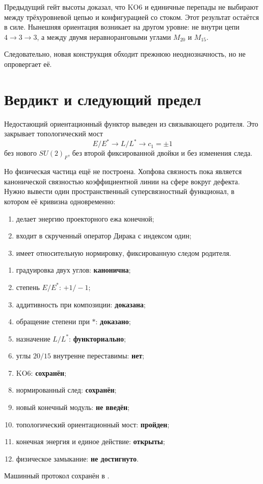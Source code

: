 Предыдущий гейт высоты доказал, что KO6 и единичные перепады не выбирают
между трёхуровневой цепью и конфигурацией со стоком. Этот результат
остаётся в силе. Нынешняя ориентация возникает на другом уровне: не внутри
цепи $4\to3\to3$, а между двумя неравноранговыми углами
$M_{20}$ и $M_{15}$.

Следовательно, новая конструкция обходит прежнюю неоднозначность, но не
опровергает её.

\section{Вердикт и следующий предел}

Недостающий ориентационный функтор выведен из связывающего родителя. Это
закрывает топологический мост
\begin{equation}
 \boxed{
 E/E^*\longrightarrow L/L^*
 \longrightarrow c_1=\pm1}
\end{equation}
без нового $SU(2)_F$, без второй фиксированной двойки и без изменения
следа.

Но физическая частица ещё не построена. Хопфова связность пока является
канонической связностью коэффициентной линии на сфере вокруг дефекта. Нужно
вывести один пространственный суперсвязностный функционал, в котором её
кривизна одновременно:
\begin{enumerate}
 \item делает энергию проекторного ежа конечной;
 \item входит в скрученный оператор Дирака с индексом один;
 \item имеет относительную нормировку, фиксированную следом родителя.
\end{enumerate}

\begin{protocol}
\begin{enumerate}
 \item градуировка двух углов: \textbf{канонична};
 \item степень $E/E^*$: \textbf{$+1/-1$};
 \item аддитивность при композиции: \textbf{доказана};
 \item обращение степени при $*$: \textbf{доказано};
 \item назначение $L/L^*$: \textbf{функториально};
 \item углы $20/15$ внутренне переставимы: \textbf{нет};
 \item KO6: \textbf{сохранён};
 \item нормированный след: \textbf{сохранён};
 \item новый конечный модуль: \textbf{не введён};
 \item топологический ориентационный мост: \textbf{пройден};
 \item конечная энергия и единое действие: \textbf{открыты};
 \item физическое замыкание: \textbf{не достигнуто}.
\end{enumerate}
\end{protocol}

Машинный протокол сохранён в
.